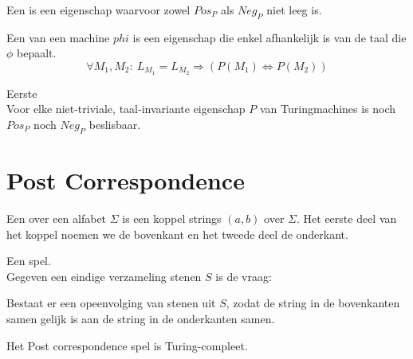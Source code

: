\documentclass[main.tex]{subfiles}
\begin{document}
\begin{de}
  Een  is een eigenschap waarvoor zowel $Pos_{P}$ als $Neg_{P}$ niet leeg is.
\end{de}

\begin{de}
  Een  van een machine $phi$ is een eigenschap die enkel afhankelijk is van de taal die $\phi$ bepaalt.
  \[ \forall M_{1},M_{2}:\ L_{M_{1}} = L_{M_{2}} \Rightarrow (P(M_{1}) \Leftrightarrow P(M_{2})) \]
\end{de}

\begin{st}
  \label{st:eerste-stelling-van-rice}
  Eerste \\
  Voor elke niet-triviale, taal-invariante eigenschap $P$ van Turingmachines is noch $Pos_{P}$ noch $Neg_{P}$ beslisbaar.

\end{st}


\section{Post Correspondence}
\label{sec:post-correspondence}

\begin{de}
  Een  over een alfabet $\Sigma$ is een koppel strings $(a,b)$ over $\Sigma$.
  Het eerste deel van het koppel noemen we de bovenkant en het tweede deel de onderkant.
\end{de}

\begin{de}
  \label{post:correspondence}
  Een  spel.\\
  Gegeven een eindige verzameling stenen $S$ is de vraag:
  \begin{center}
    Bestaat er een opeenvolging van stenen uit $S$, zodat de string in de bovenkanten samen gelijk is aan de string in de onderkanten samen.
  \end{center}
\end{de}

\begin{st}
  \label{st:pc-is-turing-compleet}
  Het Post correspondence spel is Turing-compleet.
\end{st}
\end{document}
